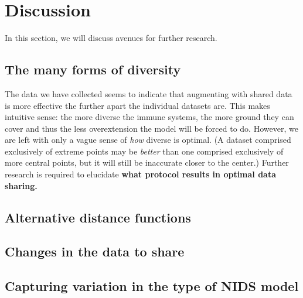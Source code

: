 \section{Discussion}
\label{sec:discussion}

In this section, we will discuss avenues for further research.

\subsection{The many forms of diversity}

    The data we have collected seems to indicate that augmenting with shared data is more effective the further apart the individual datasets are. This makes intuitive sense: the more diverse the immune systems, the more ground they can cover and thus the less overextension the model will be forced to do. However, we are left with only a vague sense of \textit{how} diverse is optimal. (A dataset comprised exclusively of extreme points may be \textit{better} than one comprised exclusively of more central points, but it will still be inaccurate closer to the center.) Further research is required to elucidate \textbf{what protocol results in optimal data sharing.}
    
\subsection{Alternative distance functions}
    
    
\subsection{Changes in the data to share}

    
\subsection{Capturing variation in the type of NIDS model}

